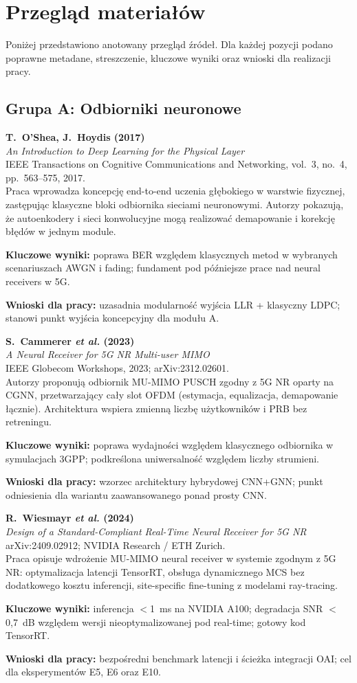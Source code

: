 \documentclass[12pt, a4paper]{article}
\newcommand{\bibentry}[4]{%
    \textbf{#1}\\
    \textit{#2}\\
    #3\\
    \vspace{0.3em}
    #4
    \vspace{0.8em}
}
\begin{document}
\section{Przegląd materiałów}

Poniżej przedstawiono anotowany przegląd źródeł. Dla każdej pozycji podano poprawne metadane, streszczenie, kluczowe wyniki oraz wnioski dla realizacji pracy.

\subsection{Grupa A: Odbiorniki neuronowe}

\bibentry{%
    T.~O'Shea, J.~Hoydis (2017)}%
    {An Introduction to Deep Learning for the Physical Layer}%
    {IEEE Transactions on Cognitive Communications and Networking, vol.~3, no.~4, pp.~563--575, 2017.}%
    {Praca wprowadza koncepcję end-to-end uczenia głębokiego w warstwie fizycznej, zastępując klasyczne bloki odbiornika sieciami neuronowymi. Autorzy pokazują, że autoenkodery i sieci konwolucyjne mogą realizować demapowanie i korekcję błędów w jednym module.

    \textbf{Kluczowe wyniki:} poprawa BER względem klasycznych metod w wybranych scenariuszach AWGN i fading; fundament pod późniejsze prace nad neural receivers w 5G.

    \textbf{Wnioski dla pracy:} uzasadnia modularność wyjścia LLR + klasyczny LDPC; stanowi punkt wyjścia koncepcyjny dla modułu A.}

\bibentry{%
    S.~Cammerer \textit{et al.} (2023)}%
    {A Neural Receiver for 5G NR Multi-user MIMO}%
    {IEEE Globecom Workshops, 2023; arXiv:2312.02601.}%
    {Autorzy proponują odbiornik MU-MIMO PUSCH zgodny z 5G NR oparty na CGNN, przetwarzający cały slot OFDM (estymacja, equalizacja, demapowanie łącznie). Architektura wspiera zmienną liczbę użytkowników i PRB bez retreningu.

    \textbf{Kluczowe wyniki:} poprawa wydajności względem klasycznego odbiornika w symulacjach 3GPP; podkreślona uniwersalność względem liczby strumieni.

    \textbf{Wnioski dla pracy:} wzorzec architektury hybrydowej CNN+GNN; punkt odniesienia dla wariantu zaawansowanego ponad prosty CNN.}

\bibentry{%
    R.~Wiesmayr \textit{et al.} (2024)}%
    {Design of a Standard-Compliant Real-Time Neural Receiver for 5G NR}%
    {arXiv:2409.02912; NVIDIA Research / ETH Zurich.}%
    {Praca opisuje wdrożenie MU-MIMO neural receiver w systemie zgodnym z 5G NR: optymalizacja latencji TensorRT, obsługa dynamicznego MCS bez dodatkowego kosztu inferencji, site-specific fine-tuning z modelami ray-tracing.

    \textbf{Kluczowe wyniki:} inferencja $<$1~ms na NVIDIA A100; degradacja SNR $<$0,7~dB względem wersji nieoptymalizowanej pod real-time; gotowy kod TensorRT.

    \textbf{Wnioski dla pracy:} bezpośredni benchmark latencji i ścieżka integracji OAI; cel dla eksperymentów E5, E6 oraz E10.}
\end{document}
